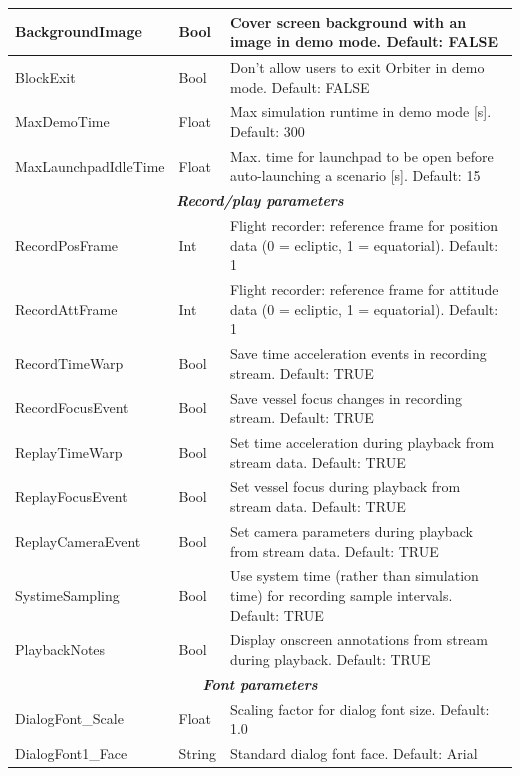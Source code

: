 \documentclass[Orbiter User Manual.tex]{subfiles}
\begin{document}
\begin{longtable}{ |p{}|p{}|p{}| }
	\hline\rule{0pt}{2ex}
	BackgroundImage & Bool & Cover screen background with an image in demo mode. Default: FALSE\\
	\hline\rule{0pt}{2ex}
	BlockExit & Bool & Don't allow users to exit Orbiter in demo mode. Default: FALSE\\
	\hline\rule{0pt}{2ex}
	MaxDemoTime & Float & Max simulation runtime in demo mode [s]. Default: 300\\
	\hline\rule{0pt}{2ex}
	MaxLaunchpadIdleTime & Float & Max. time for launchpad to be open before auto-launching a scenario [s]. Default: 15\\
	\hline
	\multicolumn{3}{|c|}{\rule{0pt}{2ex}\textbf{\textit{Record/play parameters}}}\\
	\hline\rule{0pt}{2ex}
	RecordPosFrame & Int & Flight recorder: reference frame for position data (0 = ecliptic, 1 = equatorial). Default: 1\\
	\hline\rule{0pt}{2ex}
	RecordAttFrame & Int & Flight recorder: reference frame for attitude data (0 = ecliptic, 1 = equatorial). Default: 1\\
	\hline\rule{0pt}{2ex}
	RecordTimeWarp & Bool & Save time acceleration events in recording stream. Default: TRUE\\
	\hline\rule{0pt}{2ex}
	RecordFocusEvent & Bool & Save vessel focus changes in recording stream. Default: TRUE\\
	\hline\rule{0pt}{2ex}
	ReplayTimeWarp & Bool & Set time acceleration during playback from stream data. Default: TRUE\\
	\hline\rule{0pt}{2ex}
	ReplayFocusEvent & Bool & Set vessel focus during playback from stream data. Default: TRUE\\
	\hline\rule{0pt}{2ex}
	ReplayCameraEvent & Bool & Set camera parameters during playback from stream data. Default: TRUE\\
	\hline\rule{0pt}{2ex}
	SystimeSampling & Bool & Use system time (rather than simulation time) for recording sample intervals. Default: TRUE\\
	\hline\rule{0pt}{2ex}
	PlaybackNotes & Bool & Display onscreen annotations from stream during playback. Default: TRUE\\
	\hline
	\multicolumn{3}{|c|}{\rule{0pt}{2ex}\textbf{\textit{Font parameters}}}\\
	\hline\rule{0pt}{2ex}
	DialogFont\_Scale & Float & Scaling factor for dialog font size. Default: 1.0\\
	\hline\rule{0pt}{2ex}
	DialogFont1\_Face & String & Standard dialog font face. Default: Arial\\

\end{longtable}
\end{document}
